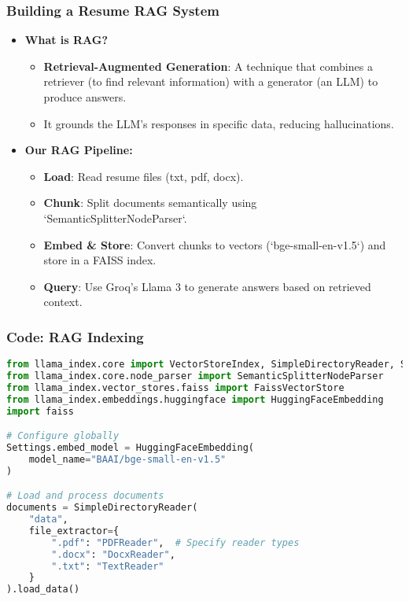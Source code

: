 \begin{frame}[fragile]\frametitle{Building a Resume RAG System}
    \begin{itemize}
        \item \textbf{What is RAG?}
        \begin{itemize}
            \item \textbf{Retrieval-Augmented Generation}: A technique that combines a retriever (to find relevant information) with a generator (an LLM) to produce answers.
            \item It grounds the LLM's responses in specific data, reducing hallucinations.
        \end{itemize}
        \item \textbf{Our RAG Pipeline:}
        \begin{itemize}
            \item \textbf{Load}: Read resume files (txt, pdf, docx).
            \item \textbf{Chunk}: Split documents semantically using `SemanticSplitterNodeParser`.
            \item \textbf{Embed \& Store}: Convert chunks to vectors (`bge-small-en-v1.5`) and store in a FAISS index.
            \item \textbf{Query}: Use Groq's Llama 3 to generate answers based on retrieved context.
        \end{itemize}
    \end{itemize}
\end{frame}

\begin{frame}[fragile]\frametitle{Code: RAG Indexing}
    \begin{lstlisting}[language=Python, basicstyle=\tiny, caption={llm\_llamaindex\_rag.py - Building the Index}]
from llama_index.core import VectorStoreIndex, SimpleDirectoryReader, Settings
from llama_index.core.node_parser import SemanticSplitterNodeParser
from llama_index.vector_stores.faiss import FaissVectorStore
from llama_index.embeddings.huggingface import HuggingFaceEmbedding
import faiss

# Configure globally
Settings.embed_model = HuggingFaceEmbedding(
    model_name="BAAI/bge-small-en-v1.5"
)

# Load and process documents
documents = SimpleDirectoryReader(
    "data",
    file_extractor={
        ".pdf": "PDFReader",  # Specify reader types
        ".docx": "DocxReader",
        ".txt": "TextReader"
    }
).load_data()

    \end{lstlisting}
\end{frame}

